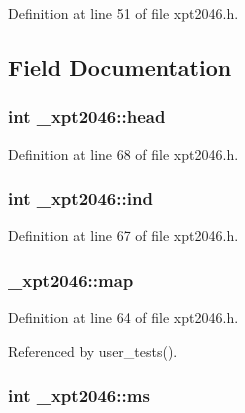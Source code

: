 Definition at line 51 of file xpt2046.\+h.



\subsection{Field Documentation}
\subsubsection[{\texorpdfstring{head}{head}}]{\setlength{\rightskip}{0pt plus 5cm}int \+\_\+xpt2046\+::head}\hypertarget{struct__xpt2046_a8b4e70a2d7a60543902ac8648c986a31}{}\label{struct__xpt2046_a8b4e70a2d7a60543902ac8648c986a31}


Definition at line 68 of file xpt2046.\+h.

\subsubsection[{\texorpdfstring{ind}{ind}}]{\setlength{\rightskip}{0pt plus 5cm}int \+\_\+xpt2046\+::ind}\hypertarget{struct__xpt2046_ae47d989b6ec543113fc386181ea6d98a}{}\label{struct__xpt2046_ae47d989b6ec543113fc386181ea6d98a}


Definition at line 67 of file xpt2046.\+h.

\subsubsection[{\texorpdfstring{map}{map}}]{ \+\_\+xpt2046\+::map}\hypertarget{struct__xpt2046_a851cf6f24189bb94005f00867080a4cd}{}\label{struct__xpt2046_a851cf6f24189bb94005f00867080a4cd}


Definition at line 64 of file xpt2046.\+h.



Referenced by user\+\_\+tests().

\subsubsection[{\texorpdfstring{ms}{ms}}]{\setlength{\rightskip}{0pt plus 5cm}int \+\_\+xpt2046\+::ms}\hypertarget{struct__xpt2046_a7ada38c703d34310580fbdb4625a5190}{}\label{struct__xpt2046_a7ada38c703d34310580fbdb4625a5190}


